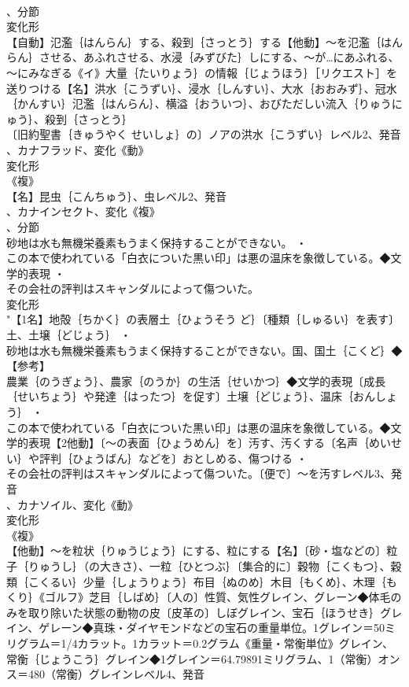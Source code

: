 \documentclass[8pt]{extreport}
\begin{document}
\begin{CJK}{UTF8}{min}
\\	、分節
\\	変化形 
\\	【自動】氾濫｛はんらん｝する、殺到｛さっとう｝する【他動】～を氾濫｛はんらん｝させる、あふれさせる、水浸｛みずびた｝しにする、～が…にあふれる、～にみなぎる《イ》大量｛たいりょう｝の情報｛じょうほう｝［リクエスト］を送りつける【名】洪水｛こうずい｝、浸水｛しんすい｝、大水｛おおみず｝、冠水｛かんすい｝氾濫｛はんらん｝、横溢｛おういつ｝、おびただしい流入｛りゅうにゅう｝、殺到｛さっとう｝
\\	〔旧約聖書｛きゅうやく せいしょ｝の〕ノアの洪水｛こうずい｝レベル2、発音
\\	、カナフラッド、変化《動》
\\	変化形 
\\	《複》
\\	【名】昆虫｛こんちゅう｝、虫レベル2、発音
\\	、カナインセクト、変化《複》
\\	、分節
\\	砂地は水も無機栄養素もうまく保持することができない。 ・
\\	この本で使われている「白衣についた黒い印」は悪の温床を象徴している。◆文学的表現 ・
\\	その会社の評判はスキャンダルによって傷ついた。
\\	変化形 
\\	"【1名】地殻｛ちかく｝の表層土｛ひょうそう ど｝〔種類｛しゅるい｝を表す〕土、土壌｛どじょう｝ ・
\\	砂地は水も無機栄養素もうまく保持することができない。国、国土｛こくど｝◆【参考】
\\	農業｛のうぎょう｝、農家｛のうか｝の生活｛せいかつ｝◆文学的表現〔成長｛せいちょう｝や発達｛はったつ｝を促す〕土壌｛どじょう｝、温床｛おんしょう｝ ・
\\	この本で使われている「白衣についた黒い印」は悪の温床を象徴している。◆文学的表現【2他動】〔～の表面｛ひょうめん｝を〕汚す、汚くする〔名声｛めいせい｝や評判｛ひょうばん｝などを〕おとしめる、傷つける ・
\\	その会社の評判はスキャンダルによって傷ついた。〔便で〕～を汚すレベル3、発音
\\	、カナソイル、変化《動》
\\	変化形 
\\	《複》
\\	【他動】～を粒状｛りゅうじょう｝にする、粒にする【名】〔砂・塩などの〕粒子｛りゅうし｝（の大きさ）、一粒｛ひとつぶ｝〔集合的に〕穀物｛こくもつ｝、穀類｛こくるい｝少量｛しょうりょう｝布目｛ぬのめ｝木目｛もくめ｝、木理｛もくり｝《ゴルフ》芝目｛しばめ｝〔人の〕性質、気性グレイン、グレーン◆体毛のみを取り除いた状態の動物の皮〔皮革の〕しぼグレイン、宝石｛ほうせき｝グレイン、ゲレーン◆真珠・ダイヤモンドなどの宝石の重量単位。1グレイン＝50ミリグラム＝1/4カラット。1カラット＝0.2グラム《重量・常衡単位》グレイン、常衡｛じょうこう｝グレイン◆1グレイン＝64.79891ミリグラム、1（常衡）オンス＝480（常衡）グレインレベル4、発音

\end{CJK}
\end{document}
